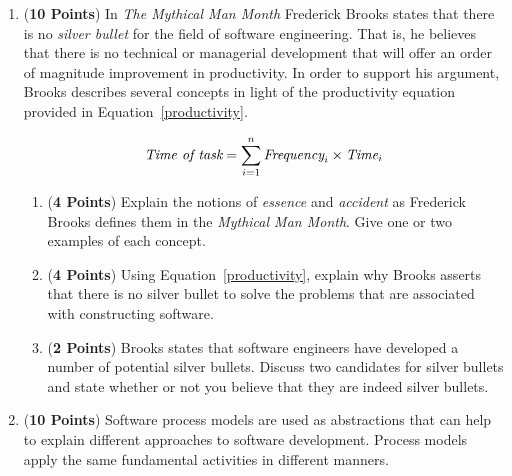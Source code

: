 \documentclass{article}
\theoremstyle{definition}
\begin{document}
\begin{enumerate}
  
\item ({\bf 10 Points}) In {\em The Mythical Man Month} Frederick
  Brooks states that there is no {\em silver bullet} for the field of
  software engineering.  That is, he believes that there is no
  technical or managerial development that will offer an order of
  magnitude improvement in productivity. In order to support his
  argument, Brooks describes several concepts in light of the
  productivity equation provided in Equation~\ref{productivity}.

        \begin{equation} \label{productivity}
        \mbox{{\em Time of task}} = \sum_{i = 1}^{n} 
                \mbox{{\em Frequency}}_i \times \mbox{{\em Time}}_i
        \end{equation}

        \begin{enumerate}
          
        \item ({\bf 4 Points}) Explain the notions of {\em essence}
          and {\em accident} as Frederick Brooks defines them in the
          {\em Mythical Man Month}.  Give one or two examples of each
          concept.
          
        \item ({\bf 4 Points}) Using Equation~\ref{productivity},
          explain why Brooks asserts that there is no silver bullet to
          solve the problems that are associated with constructing
          software.
        
        \item ({\bf 2 Points}) Brooks states that software engineers
          have developed a number of potential silver bullets.
          Discuss two candidates for silver bullets and state whether
          or not you believe that they are indeed silver bullets.

        \end{enumerate}


\newpage

\item ({\bf 10 Points}) Software process models are used as
  abstractions that can help to explain different approaches to
  software development.  Process models apply the same fundamental
  activities in different manners.


\end{enumerate}
\end{document}
